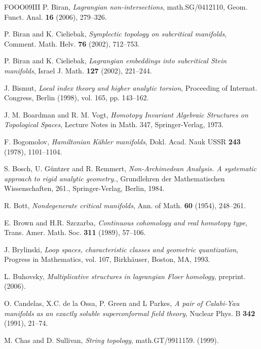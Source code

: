 \begin{thebibliography}{FOOO09III}
 P. Biran, \emph{Lagrangian non-intersections}, math.SG/0412110, Geom. Funct. Anal. \textbf{16} (2006), 279–326.

 P. Biran and K. Cieliebak, \emph{Symplectic topology on subcritical manifolds}, Comment. Math. Helv. \textbf{76} (2002), 712–753.

 P. Biran and K. Cieliebak, \emph{Lagrangian embeddings into subcritical Stein manifolds}, Israel J. Math. \textbf{127} (2002), 221–244.

 J. Bismut, \emph{Local index theory and higher analytic torsion}, Proceeding of Internat. Congress, Berlin (1998), vol. 165, pp. 143–162.

 J. M. Boardman and R. M. Vogt, \emph{Homotopy Invariant Algebraic Structures on Topological Spaces}, Lecture Notes in Math. 347, Springer-Verlag, 1973.

 F. Bogomolov, \emph{Hamiltonian Kähler manifolds}, Dokl. Acad. Nauk USSR \textbf{243} (1978), 1101–1104.

 S. Bosch, U. Güntzer and R. Remmert, \emph{Non-Archimedean Analysis. A systematic approach to rigid analytic geometry.}, Grundlehren der Mathematischen Wissenschaften, 261., Springer-Verlag, Berlin, 1984.

 R. Bott, \emph{Nondegenerate critical manifolds}, Ann. of Math. \textbf{60} (1954), 248–261.

 E. Brown and H.R. Szczarba, \emph{Continuous cohomology and real homotopy type}, Trans. Amer. Math. Soc. \textbf{311} (1989), 57–106.

 J. Brylinski, \emph{Loop spaces, characteristic classes and geometric quantization}, Progress in Mathematics, vol. 107, Birkhäuser, Boston, MA, 1993.

 L. Buhovsky, \emph{Multiplicative structures in lagrangian Floer homology}, preprint. (2006).

 O. Candelas, X.C. de la Ossa, P. Green and L Parkes, \emph{A pair of Calabi-Yau manifolds as an exactly soluble superconformal field theory}, Nuclear Phys. B \textbf{342} (1991), 21–74.

 M. Chas and D. Sullivan, \emph{String topology}, math.GT/9911159. (1999).


\end{thebibliography}
